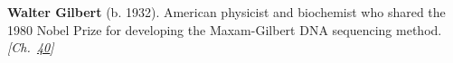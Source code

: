 \nobelchemistry \textbf{Walter Gilbert} (b. 1932). American physicist and biochemist who shared the 1980 Nobel Prize for developing the Maxam-Gilbert DNA sequencing method. \emph{[Ch.~\hyperref[ch:dnasequencing]{40}]}

